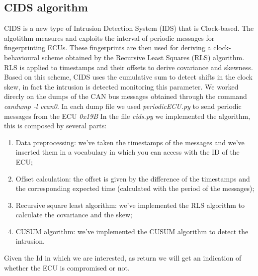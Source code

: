 \documentclass[12pt]{article}
\begin{document}
\subsection{CIDS algorithm}
CIDS is a new type of Intrusion Detection System (IDS) that is Clock-based. The algotithm measures and 
exploits the interval of periodic messages for fingerprinting ECUs. These fingerprints are then used for 
deriving a clock-behavioural scheme obtained by the Recursive Least Squares (RLS) algorithm. RLS is 
applied to timestamps and their offsets to derive covariance and skewness. Based on this scheme, 
CIDS uses the cumulative sum to detect shifts in the clock skew, in fact the intrusion is detected 
monitoring this parameter. We worked direcly on the dumps of the CAN bus messages obtained through 
the command \textit{candump -l vcan0}. In each dump file we used \textit{periodicECU.py} to send periodic 
messages from the ECU \textit{0x19B}
In the file \textit{cids.py} we implemented the algorithm, this is composed by several 
parts:
\begin{enumerate}
    \item Data preprocessing: we've taken the timestamps of the messages and we've inserted them 
    in a vocabulary in which you can access with the ID of the ECU;
    \item Offset calculation: the offset is given by the difference of the timestamps and the corresponding
    expected time (calculated with the period of the messages);
    \item Recursive square least algorithm: we've implemented the RLS algorithm to calculate the covariance 
    and the skew;
    \item CUSUM algorithm: we've implemented the CUSUM algorithm to detect the intrusion. 
\end{enumerate}
Given the Id in which we are interested, as return we will get an indication of whether the ECU is
compromised or not.
\end{document}

